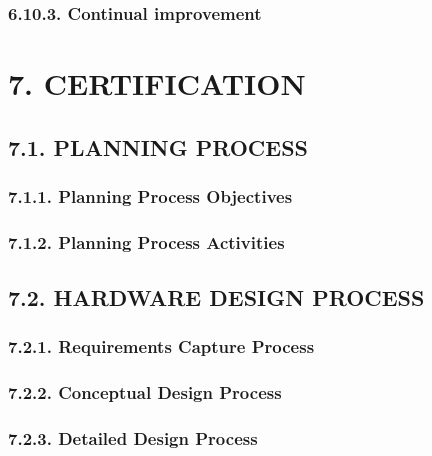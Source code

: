 \documentclass[
]{article}
\begin{document}
\hypertarget{continual-improvement-1}{%
\subsubsection{6.10.3. Continual
improvement}\label{continual-improvement-1}}

\hypertarget{certification-1}{%
\section{7. CERTIFICATION}\label{certification-1}}

\hypertarget{planning-process-1}{%
\subsection{7.1. PLANNING PROCESS}\label{planning-process-1}}

\hypertarget{planning-process-objectives-1}{%
\subsubsection{7.1.1. Planning Process
Objectives}\label{planning-process-objectives-1}}

\hypertarget{planning-process-activities-1}{%
\subsubsection{7.1.2. Planning Process
Activities}\label{planning-process-activities-1}}

\hypertarget{hardware-design-process-1}{%
\subsection{7.2. HARDWARE DESIGN
PROCESS}\label{hardware-design-process-1}}

\hypertarget{requirements-capture-process-1}{%
\subsubsection{7.2.1. Requirements Capture
Process}\label{requirements-capture-process-1}}

\hypertarget{conceptual-design-process-1}{%
\subsubsection{7.2.2. Conceptual Design
Process}\label{conceptual-design-process-1}}

\hypertarget{detailed-design-process-1}{%
\subsubsection{7.2.3. Detailed Design
Process}\label{detailed-design-process-1}}
\end{document}
